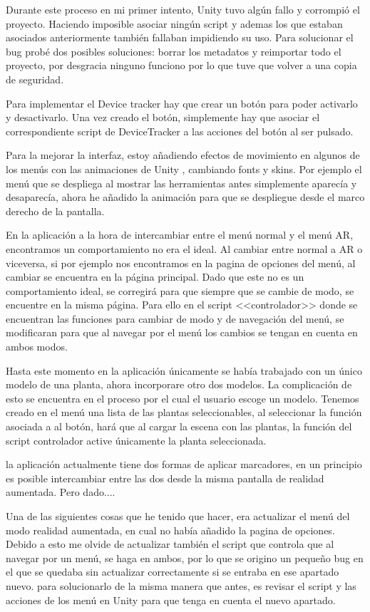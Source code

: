Durante este proceso en mi primer intento, Unity tuvo algún fallo y corrompió el proyecto. Haciendo imposible asociar ningún script y ademas los que estaban asociados anteriormente también fallaban impidiendo su uso. Para solucionar el bug probé dos posibles soluciones: borrar los metadatos y reimportar todo el proyecto, por desgracia ninguno funciono por lo que tuve que volver a una copia de seguridad.


Para implementar el Device tracker hay que crear un botón para poder activarlo y desactivarlo. Una vez creado el botón, simplemente hay que asociar el correspondiente script de DeviceTracker a las acciones del botón al ser pulsado.


Para la mejorar la interfaz, estoy añadiendo efectos de movimiento en algunos de los menús con las animaciones de Unity , cambiando fonts y skins. Por ejemplo el menú que se despliega al mostrar las herramientas antes simplemente aparecía y desaparecía, ahora he añadido la animación para que se despliegue desde el marco derecho de la pantalla.

En la aplicación a la hora de intercambiar entre el menú normal y el menú AR, encontramos un comportamiento no era el ideal. Al cambiar entre normal a AR o viceversa, si por ejemplo nos encontramos en la pagina de opciones del menú, al cambiar se encuentra en la página principal. Dado que este no es un comportamiento ideal, se corregirá para que siempre que se cambie de modo, se encuentre en la misma página. Para ello en el script <<controlador>> donde se encuentran las funciones para cambiar de modo y de navegación del menú, se modificaran para que al navegar por el menú los cambios se tengan en cuenta en ambos modos.

Hasta este momento en la aplicación únicamente se había trabajado con un único modelo de una planta, ahora incorporare otro dos modelos.  La complicación de esto se encuentra en el proceso por el cual el usuario escoge un modelo. Tenemos creado en el menú una lista de las plantas seleccionables, al seleccionar la función asociada a al botón, hará que al cargar la escena con las plantas, la función del script controlador active únicamente la planta seleccionada.

la aplicación actualmente tiene dos formas de aplicar marcadores, en un principio es posible intercambiar entre las dos desde la misma pantalla de realidad aumentada. Pero dado.... 

Una de las siguientes cosas que he tenido que hacer, era actualizar el menú del modo realidad aumentada, en cual no había añadido la pagina de opciones. Debido a esto me olvide de actualizar también el script que controla que al navegar por un menú, se haga en ambos, por lo que se origino un pequeño bug en el que se quedaba sin actualizar correctamente si se entraba en ese apartado nuevo. para solucionarlo de la misma manera que antes, es revisar el script y las acciones de los menú en Unity para que tenga en cuenta el nuevo apartado.


